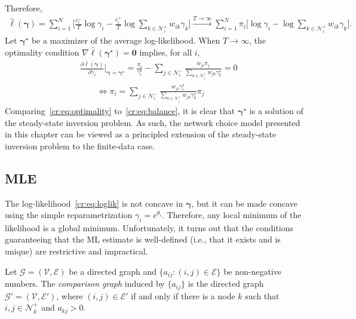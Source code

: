 Therefore,
\begin{align*}
\hat{\ell}(\bm{\gamma})
    = \sum_{i = 1}^N \bigg[ \frac{c^-_i}{T} \log \gamma_i - \frac{c^+_i}{T} \log \sum_{k \in \mathcal{N}^+_i} w_{ik} \gamma_k \bigg]
    \xrightarrow{T \to \infty} \sum_{i = 1}^N \pi_i \bigg[ \log \gamma_i - \log \sum_{k \in \mathcal{N}^+_i} w_{ik} \gamma_k \bigg].
\end{align*}
Let $\bm{\gamma}^\star$ be a maximizer of the average log-likelihood.
When $T \to \infty$, the optimality condition $\nabla \hat{\ell} (\bm{\gamma}^\star) = \bm{0}$ implies, for all $i$,
\begin{align}
&\frac{\partial \hat{\ell}(\bm{\gamma})}{\partial \gamma_i} \bigg|_{\bm{\gamma} = \bm{\gamma}^\star}
    = \frac{\pi_i}{\gamma^\star_i} - \sum_{j \in \mathcal{N}^-_i} \frac{w_{ji} \pi_j}{\sum_{k \in \mathcal{N}^+_j} w_{jk} \gamma^\star_k}
    = 0 \nonumber \\
&\qquad \iff \pi_i = \sum_{j \in \mathcal{N}^-_i} \frac{w_{ji} \gamma^\star_i}{\sum_{k \in \mathcal{N}^+_j} w_{jk} \gamma^\star_k} \pi_j \label{cr:eq:optimality}
\end{align}
Comparing~\eqref{cr:eq:optimality} to~\eqref{cr:eq:balance}, it is clear that $\bm{\gamma}^\star$ is a solution of the steady-state inversion problem.
As such, the network choice model presented in this chapter can be viewed as a principled extension of the steady-state inversion problem to the finite-data case.


\subsection{MLE}
\label{cr:sec:maxlik}

The log-likelihood~\eqref{cr:eq:loglik} is not concave in $\bm{\gamma}$, but it can be made concave using the simple reparametrization $\gamma_i = e^{\theta_i}$.
Therefore, any local minimum of the likelihood is a global minimum.
Unfortunately, it turns out that the conditions guaranteeing that the ML estimate is well-defined (i.e., that it exists and is unique) are restrictive and impractical.

\begin{definition}
Let $\mathcal{G} = (\mathcal{V}, \mathcal{E})$ be a directed graph and $\{ a_{ij} : (i,j) \in \mathcal{E} \}$ be non-negative numbers.
The \emph{comparison graph} induced by $\{ a_{ij} \}$ is the directed graph $\mathcal{G}' = (\mathcal{V}, \mathcal{E}')$, where $(i,j) \in \mathcal{E}'$ if and only if there is a node $k$ such that $i, j \in \mathcal{N}^+_k$ and $a_{kj} > 0$.
\end{definition}

